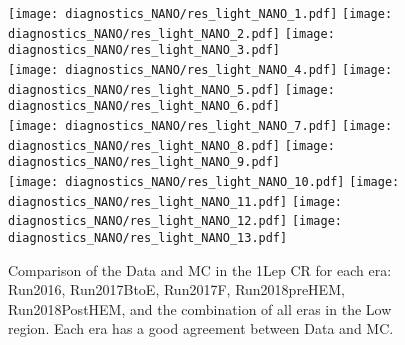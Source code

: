 \begin{figure}[!htb]
	\begin{center}
  \texttt{[image: diagnostics\_NANO/res\_light\_NANO\_1.pdf]}
  \texttt{[image: diagnostics\_NANO/res\_light\_NANO\_2.pdf]} 
  \texttt{[image: diagnostics\_NANO/res\_light\_NANO\_3.pdf]} \\
  \texttt{[image: diagnostics\_NANO/res\_light\_NANO\_4.pdf]}
  \texttt{[image: diagnostics\_NANO/res\_light\_NANO\_5.pdf]} 
  \texttt{[image: diagnostics\_NANO/res\_light\_NANO\_6.pdf]} \\
  \texttt{[image: diagnostics\_NANO/res\_light\_NANO\_7.pdf]}
  \texttt{[image: diagnostics\_NANO/res\_light\_NANO\_8.pdf]} 
  \texttt{[image: diagnostics\_NANO/res\_light\_NANO\_9.pdf]} \\
  \texttt{[image: diagnostics\_NANO/res\_light\_NANO\_10.pdf]}
  \texttt{[image: diagnostics\_NANO/res\_light\_NANO\_11.pdf]} 
  \texttt{[image: diagnostics\_NANO/res\_light\_NANO\_12.pdf]}     
  \texttt{[image: diagnostics\_NANO/res\_light\_NANO\_13.pdf]} \\      
	\end{center}
	\caption[Light Jet Response]{Comparison of the Data and MC in the 1Lep CR for each era: Run2016, Run2017BtoE, Run2017F, Run2018preHEM, Run2018PostHEM, and the combination of all eras in the Low \dm{} region. Each era has a good agreement between Data and MC. 
	 }
	\label{fig:qcd-1lcr-datavsmc-lm-inclusive}
\end{figure}
